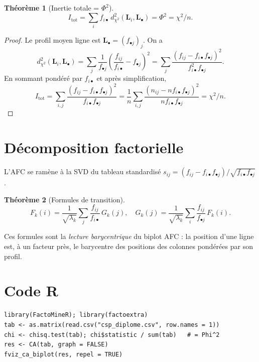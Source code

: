 \documentclass[11pt, a4paper, openany]{book}
\theoremstyle{plain}
\newtheorem{theorem}{Théorème}[chapter]
\theoremstyle{definition}
\theoremstyle{remark}
\newcommand{\1}{\mathds{1}}
\begin{document}
\begin{theorem}[Inertie totale = $\Phi^2$]
\[
I_{\text{tot}} = \sum_i f_{i\bullet}\, d_{\chi^2}^2(\mathbf{L}_i, \mathbf{L}_\bullet)
= \Phi^2 = \chi^2 / n.
\]
\end{theorem}

\begin{proof}
Le profil moyen ligne est $\mathbf{L}_\bullet = (f_{\bullet j})_j$. On a
\[
d_{\chi^2}^2(\mathbf{L}_i, \mathbf{L}_\bullet) = \sum_j \frac{1}{f_{\bullet j}}
\left(\frac{f_{ij}}{f_{i\bullet}} - f_{\bullet j}\right)^2
= \sum_j \frac{(f_{ij} - f_{i\bullet} f_{\bullet j})^2}{f_{i\bullet}^2 f_{\bullet j}}.
\]
En sommant pondéré par $f_{i\bullet}$ et après simplification,
\[
I_{\text{tot}} = \sum_{i,j} \frac{(f_{ij} - f_{i\bullet} f_{\bullet j})^2}{f_{i\bullet} f_{\bullet j}}
= \frac{1}{n}\sum_{i,j} \frac{(n_{ij} - n f_{i\bullet} f_{\bullet j})^2}{n f_{i\bullet} f_{\bullet j}}
= \chi^2 / n.
\]
\end{proof}

\section{Décomposition factorielle}

L'AFC se ramène à la SVD du tableau standardisé $s_{ij} = (f_{ij} - f_{i\bullet} f_{\bullet j})/\sqrt{f_{i\bullet} f_{\bullet j}}$.

\begin{theorem}[Formules de transition]
\[
F_k(i) = \frac{1}{\sqrt{\lambda_k}}\sum_j \frac{f_{ij}}{f_{i\bullet}}\, G_k(j),
\quad
G_k(j) = \frac{1}{\sqrt{\lambda_k}}\sum_i \frac{f_{ij}}{f_{\bullet j}}\, F_k(i).
\]
\end{theorem}

Ces formules sont la \textit{lecture barycentrique} du biplot AFC : la position
d'une ligne est, à un facteur près, le barycentre des positions des colonnes
pondérées par son profil.

\section{Code R}
\begin{lstlisting}
library(FactoMineR); library(factoextra)
tab <- as.matrix(read.csv("csp_diplome.csv", row.names = 1))
chi <- chisq.test(tab); chi$statistic / sum(tab)   # = Phi^2
res <- CA(tab, graph = FALSE)
fviz_ca_biplot(res, repel = TRUE)
\end{lstlisting}

\end{document}
